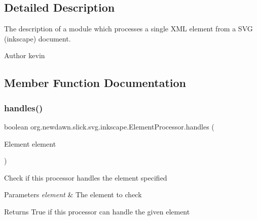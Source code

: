 \subsection{Detailed Description}
The description of a module which processes a single X\+ML element from a S\+VG (inkscape) document.

\begin{DoxyAuthor}{Author}
kevin 
\end{DoxyAuthor}


\subsection{Member Function Documentation}
\mbox{\label{interfaceorg_1_1newdawn_1_1slick_1_1svg_1_1inkscape_1_1_element_processor_ae95bbf21a67c52aff02cf09259c554a3}} 
\subsubsection{\texorpdfstring{handles()}{handles()}}
{\footnotesize\ttfamily boolean org.\+newdawn.\+slick.\+svg.\+inkscape.\+Element\+Processor.\+handles (\begin{DoxyParamCaption}\item[{Element}]{element }\end{DoxyParamCaption})}

Check if this processor handles the element specified


\begin{DoxyParams}{Parameters}
{\em element} & The element to check \\
\hline
\end{DoxyParams}
\begin{DoxyReturn}{Returns}
True if this processor can handle the given element 
\end{DoxyReturn}


